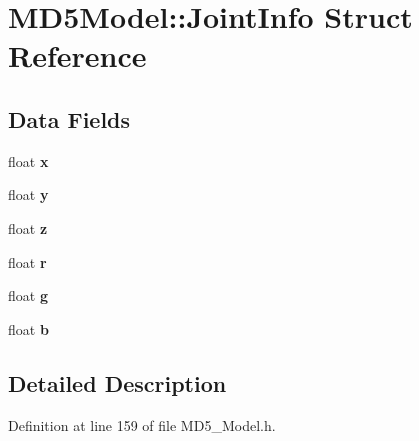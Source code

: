 \hypertarget{struct_m_d5_model_1_1_joint_info}{}\section{M\+D5\+Model\+:\+:Joint\+Info Struct Reference}
\label{struct_m_d5_model_1_1_joint_info}
\subsection*{Data Fields}
\begin{DoxyCompactItemize}
\item 
float {\bfseries x}\hypertarget{struct_m_d5_model_1_1_joint_info_ab93ec32353acab4194a77df8c007bf59}{}\label{struct_m_d5_model_1_1_joint_info_ab93ec32353acab4194a77df8c007bf59}

\item 
float {\bfseries y}\hypertarget{struct_m_d5_model_1_1_joint_info_aecb9cf51fa82cf8bbcf90a8038b82d29}{}\label{struct_m_d5_model_1_1_joint_info_aecb9cf51fa82cf8bbcf90a8038b82d29}

\item 
float {\bfseries z}\hypertarget{struct_m_d5_model_1_1_joint_info_a45dea9ea0b4c20b3d01b7dc6a2e1b2fe}{}\label{struct_m_d5_model_1_1_joint_info_a45dea9ea0b4c20b3d01b7dc6a2e1b2fe}

\item 
float {\bfseries r}\hypertarget{struct_m_d5_model_1_1_joint_info_ae8a22b483fc5aa635895443a80fa9c6f}{}\label{struct_m_d5_model_1_1_joint_info_ae8a22b483fc5aa635895443a80fa9c6f}

\item 
float {\bfseries g}\hypertarget{struct_m_d5_model_1_1_joint_info_ac0cb2ca2d6e93aa62ac048baacd97d79}{}\label{struct_m_d5_model_1_1_joint_info_ac0cb2ca2d6e93aa62ac048baacd97d79}

\item 
float {\bfseries b}\hypertarget{struct_m_d5_model_1_1_joint_info_a320a061e581d3dff7980c0c7a57a2543}{}\label{struct_m_d5_model_1_1_joint_info_a320a061e581d3dff7980c0c7a57a2543}

\end{DoxyCompactItemize}


\subsection{Detailed Description}


Definition at line 159 of file M\+D5\+\_\+\+Model.\+h.


